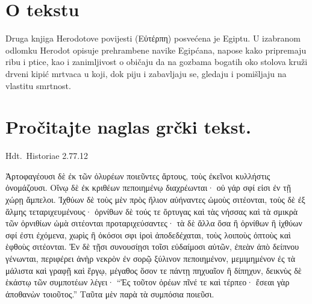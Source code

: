 

\section*{O tekstu}

Druga knjiga Herodotove povijesti \textgreek[variant=ancient]{(Εὐτέρπη)} posvećena je Egiptu. U izabranom odlomku Herodot opisuje prehrambene navike Egipćana, napose kako pripremaju ribu i ptice, kao i zanimljivost o običaju da na gozbama bogatih oko stolova kruži drveni kipić mrtvaca u koji, dok piju i zabavljaju se, gledaju i pomišljaju na vlastitu smrtnost.


\section*{Pročitajte naglas grčki tekst.}

Hdt.\ Historiae 2.77.12


\medskip

\begin{greek}
{\large
{ \noindent Ἀρτοφαγέουσι δὲ ἐκ τῶν ὀλυρέων ποιεῦντες ἄρτους, τοὺς ἐκεῖνοι κυλλήστις ὀνομάζουσι. Οἴνῳ δὲ ἐκ κριθέων πεποιημένῳ διαχρέωνται· οὐ γάρ σφί εἰσι ἐν τῇ χώρῃ ἄμπελοι. Ἰχθύων δὲ τοὺς μὲν πρὸς ἥλιον αὐήναντες ὠμοὺς σιτέονται, τοὺς δὲ ἐξ ἅλμης τεταριχευμένους· ὀρνίθων δὲ τούς τε ὄρτυγας καὶ τὰς νήσσας καὶ τὰ σμικρὰ τῶν ὀρνιθίων ὠμὰ σιτέονται προταριχεύσαντες· τὰ δὲ ἄλλα ὅσα ἢ ὀρνίθων ἢ ἰχθύων σφί ἐστι ἐχόμενα, χωρὶς ἢ ὁκόσοι σφι ἱροὶ ἀποδεδέχαται, τοὺς λοιποὺς ὀπτοὺς καὶ ἑφθοὺς σιτέονται. Ἐν δὲ τῇσι συνουσίῃσι τοῖσι εὐδαίμοσι αὐτῶν, ἐπεὰν ἀπὸ δείπνου γένωνται, περιφέρει ἀνὴρ νεκρὸν ἐν σορῷ ξύλινον πεποιημένον, μεμιμημένον ἐς τὰ μάλιστα καὶ γραφῇ καὶ ἔργῳ, μέγαθος ὅσον τε πάντῃ πηχυαῖον ἢ δίπηχυν, δεικνὺς δὲ ἑκάστῳ τῶν συμποτέων λέγει· ``Ἐς τοῦτον ὁρέων πῖνέ τε καὶ τέρπεο· ἔσεαι γὰρ ἀποθανὼν τοιοῦτος.'' Ταῦτα μὲν παρὰ τὰ συμπόσια ποιεῦσι.

}
}
\end{greek}

